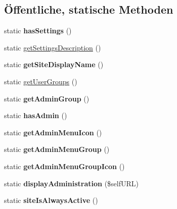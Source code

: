 \subsection*{Öffentliche, statische Methoden}
\begin{DoxyCompactItemize}
\item 
\mbox{\label{classprint_settings_ac233145a0dc745eb29e0c7930d26e639}} 
static {\bfseries has\+Settings} ()
\item 
static \mbox{\hyperlink{classprint_settings_a92bf3ffd39fc32c40aedaa042f069e53}{get\+Settings\+Description}} ()
\item 
\mbox{\label{classprint_settings_a1bdff93152e3f9b4c6e789c2183b0644}} 
static {\bfseries get\+Site\+Display\+Name} ()
\item 
static \mbox{\hyperlink{classprint_settings_abc2930e1c62b9a046e668913de24b29c}{get\+User\+Groups}} ()
\item 
\mbox{\label{classprint_settings_a621919237d2295aaa73b170cc9245b5f}} 
static {\bfseries get\+Admin\+Group} ()
\item 
\mbox{\label{classprint_settings_aaa5f5e1aa7ef61177b5f8acb56dbdfaf}} 
static {\bfseries has\+Admin} ()
\item 
\mbox{\label{classprint_settings_a9cb8b1b4050ad5877e392794186794cc}} 
static {\bfseries get\+Admin\+Menu\+Icon} ()
\item 
\mbox{\label{classprint_settings_a819a6a072f62c00439edf052e583d041}} 
static {\bfseries get\+Admin\+Menu\+Group} ()
\item 
\mbox{\label{classprint_settings_ab99804e1567e983eef77aef30e6cfc69}} 
static {\bfseries get\+Admin\+Menu\+Group\+Icon} ()
\item 
\mbox{\label{classprint_settings_a608ab676c460a8878ff07da5d0ab1787}} 
static {\bfseries display\+Administration} (\$self\+U\+RL)
\item 
\mbox{\label{classprint_settings_aeea56f659046dd8b2e5d74874ea38876}} 
static {\bfseries site\+Is\+Always\+Active} ()
\end{DoxyCompactItemize}
